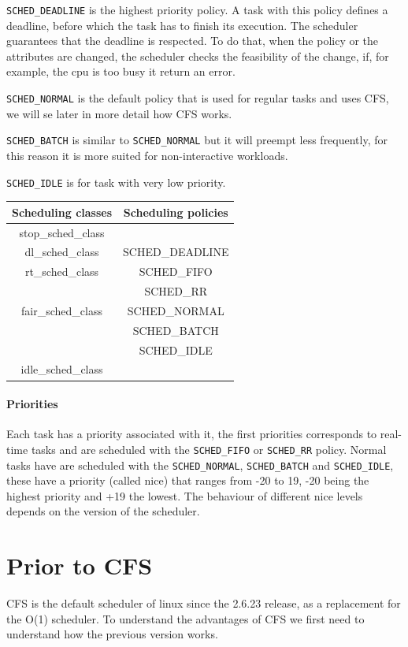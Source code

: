 \documentclass[10pt]{book}
\begin{document}
\verb|SCHED_DEADLINE| is the highest priority policy. A task with this policy defines a deadline, before which the task has to finish its execution. The scheduler guarantees that the deadline is respected. To do that, when the policy or the attributes are changed, the scheduler checks the feasibility of the change, if, for example, the cpu is too busy it return an error.

\verb|SCHED_NORMAL| is the default policy that is used for regular tasks and uses CFS, we will se later in more detail how CFS works.

\verb|SCHED_BATCH| is similar to \verb|SCHED_NORMAL| but it will preempt less frequently, for this reason it is more suited for non-interactive workloads.

\verb|SCHED_IDLE| is for task with very low priority.

\begin{tabular}{|c|c|}
\hline
\textbf{Scheduling classes} & \textbf{Scheduling policies}\\
\hline
stop\_sched\_class &\\
\hline
dl\_sched\_class   & SCHED\_DEADLINE\\
\hline
rt\_sched\_class   & SCHED\_FIFO \\
                   		   & SCHED\_RR\\
\hline
fair\_sched\_class & SCHED\_NORMAL\\
                   & SCHED\_BATCH\\
                   & SCHED\_IDLE\\
\hline
idle\_sched\_class &\\          
\hline
\end{tabular}


\paragraph{Priorities}
Each task has a priority associated with it, the first priorities corresponds to real-time tasks and are scheduled with the \verb|SCHED_FIFO| or \verb|SCHED_RR| policy. Normal tasks have are scheduled with the \verb|SCHED_NORMAL|, \verb|SCHED_BATCH| and \verb|SCHED_IDLE|, these have a priority (called nice) that ranges from -20 to 19, -20 being the highest priority and +19 the lowest. The behaviour of different nice levels depends on the version of the scheduler.

\label{sec:cfs}
\section{Prior to CFS} 
CFS is the default scheduler of linux since the 2.6.23 release, as a replacement for the O(1) scheduler. To understand the advantages of CFS we first need to understand how the previous version works.
\end{document}
